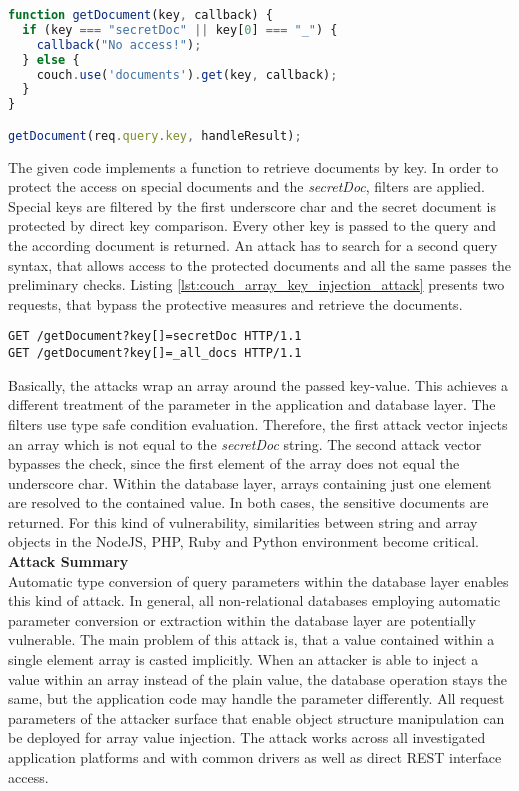 \begin{lstlisting}[caption={Vulnerable NodeJS example for array key injection against CouchDB}, label={lst:couch_array_key_injection}, language=JavaScript]
function getDocument(key, callback) {
  if (key === "secretDoc" || key[0] === "_") {
    callback("No access!");
  } else {
    couch.use('documents').get(key, callback);
  }
}

getDocument(req.query.key, handleResult);
\end{lstlisting}

The given code implements a function to retrieve documents by key. In order to protect the access on special documents and the \emph{secretDoc}, filters are applied. Special keys are filtered by the first underscore char and the secret document is protected by direct key comparison. Every other key is passed to the query and the according document is returned. An attack has to search for a second query syntax, that allows access to the protected documents and all the same passes the preliminary checks. Listing \ref{lst:couch_array_key_injection_attack} presents two requests, that bypass the protective measures and retrieve the documents. \\

\begin{lstlisting}[caption={Attack vectors against CouchDB for array key injection via the query-string parameter}, label={lst:couch_array_key_injection_attack}]
GET /getDocument?key[]=secretDoc HTTP/1.1
GET /getDocument?key[]=_all_docs HTTP/1.1
\end{lstlisting}

Basically, the attacks wrap an array around the passed key-value. This achieves a different treatment of the parameter in the application and database layer. The filters use type safe condition evaluation. Therefore, the first attack vector injects an array which is not equal to the \emph{secretDoc} string. The second attack vector bypasses the check, since the first element of the array does not equal the underscore char. Within the database layer, arrays containing just one element are resolved to the contained value. In both cases, the sensitive documents are returned. For this kind of vulnerability, similarities between string and array objects in the NodeJS, PHP, Ruby and Python environment become critical. \\

\textbf{Attack Summary} \\
Automatic type conversion of query parameters within the database layer enables this kind of attack. In general, all non-relational databases employing automatic parameter conversion or extraction within the database layer are potentially vulnerable. The main problem of this attack is, that a value contained within a single element array is casted implicitly. When an attacker is able to inject a value within an array instead of the plain value, the database operation stays the same, but the application code may handle the parameter differently. All request parameters of the attacker surface that enable object structure manipulation can be deployed for array value injection. The attack works across all investigated application platforms and with common drivers as well as direct REST interface access. 

